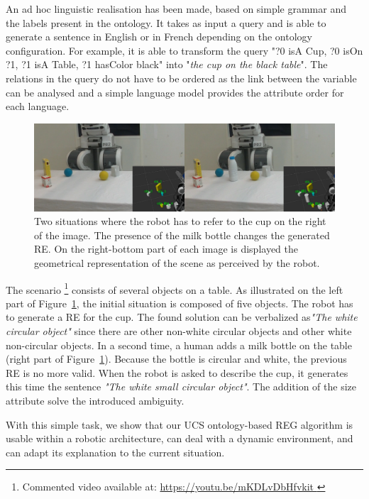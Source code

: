 An ad hoc linguistic realisation has been made, based on simple grammar and the labels present in the ontology. It takes as input a \sparql{} query and is able to generate a sentence in English or in French depending on the ontology configuration. For example, it is able to transform the query "?0 isA Cup, ?0 isOn ?1, ?1 isA Table, ?1 hasColor black" into "\textit{the cup on the black table}". The relations in the query do not have to be ordered as the link between the variable can be analysed and a simple language model provides the attribute order for each language.

\begin{figure}[h!]
\centering
\includegraphics[width=\textwidth]{figures/chapter4/pr2.png}
\caption{\label{fig:chap4_pr2} Two situations where the robot has to refer to the cup on the right of the image. The presence of the milk bottle changes the generated RE. On the right-bottom part of each image is displayed the geometrical representation of the scene as perceived by the robot.}
\end{figure}

The scenario \footnote{Commented video available at: \url{https://youtu.be/mKDLvDbHfvkit }} consists of several objects on a table. As illustrated on the left part of Figure~\ref{fig:chap4_pr2}, the initial situation is composed of five objects. The robot has to generate a RE for the cup. The found solution can be verbalized as\textit{"The white circular object"} since there are other non-white circular objects and other white non-circular objects. In a second time, a human adds a milk bottle on the table (right part of Figure~\ref{fig:chap4_pr2}). Because the bottle is circular and white, the previous RE is no more valid. When the robot is asked to describe the cup, it generates this time the sentence \textit{"The white small circular object"}. The addition of the size attribute solve the introduced ambiguity.

With this simple task, we show that our UCS ontology-based REG algorithm is usable within a robotic architecture, can deal with a dynamic environment, and can adapt its explanation to the current situation.
